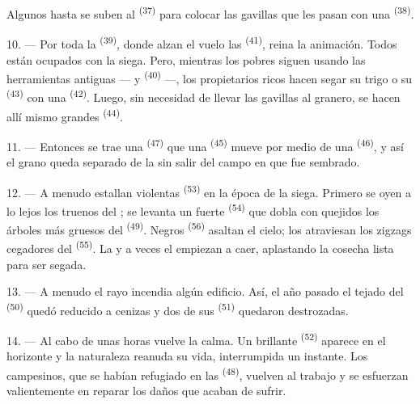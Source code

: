 Algunos hasta se suben al  \textsuperscript{(37)} para colocar las
gavillas que les pasan con una  \textsuperscript{(38)}.

10. --- Por toda la  \textsuperscript{(39)}, donde alzan el vuelo las
 \textsuperscript{(41)}, reina la animación. Todos están ocupados
con la siega. Pero, mientras los pobres siguen usando las herramientas
antiguas ---  y  \textsuperscript{(40)} ---,
los propietarios ricos hacen segar su trigo o su 
\textsuperscript{(43)} con una  \textsuperscript{(42)}. Luego, sin
necesidad de llevar las gavillas al granero, se hacen allí mismo grandes
 \textsuperscript{(44)}.

11. --- Entonces se trae una  \textsuperscript{(47)} que una
 \textsuperscript{(45)} mueve por medio de una  \textsuperscript{(46)}, y así el grano queda separado de la
 sin salir del campo en que fue sembrado.

\VUsaut{5.0mm}
\VUsaut{3.4mm}

12. --- A menudo estallan violentas  \textsuperscript{(53)} en la
época de la siega. Primero se oyen a lo lejos los truenos del
; se levanta un fuerte 
\textsuperscript{(54)} que dobla con quejidos los árboles más gruesos del
 \textsuperscript{(49)}. Negros  \textsuperscript{(56)}
asaltan el cielo; los atraviesan los zigzags cegadores del
 \textsuperscript{(55)}. La  y a veces el
 empiezan a caer, aplastando la cosecha lista para ser
segada.

13. --- A menudo el rayo incendia algún edificio. Así, el año pasado el
tejado del  \textsuperscript{(50)} quedó reducido a cenizas
y dos de sus  \textsuperscript{(51)} quedaron destrozadas.

14. --- Al cabo de unas horas vuelve la calma. Un brillante  \textsuperscript{(52)} aparece en el horizonte y la naturaleza reanuda su
vida, interrumpida un instante. Los campesinos, que se habían refugiado
en las  \textsuperscript{(48)}, vuelven al trabajo y se esfuerzan
valientemente en reparar los daños que acaban de sufrir.

